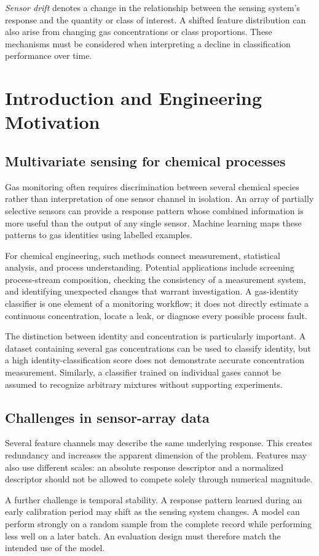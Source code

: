 \documentclass[11pt,a4paper]{article}
\newcommand{\sectionpage}[1]{\clearpage\section{#1}}
\begin{document}
\emph{Sensor drift} denotes a change in the relationship between the sensing system's response and the quantity or class of interest. A shifted feature distribution can also arise from changing gas concentrations or class proportions. These mechanisms must be considered when interpreting a decline in classification performance over time.

\sectionpage{Introduction and Engineering Motivation}
\subsection{Multivariate sensing for chemical processes}
Gas monitoring often requires discrimination between several chemical species rather than interpretation of one sensor channel in isolation. An array of partially selective sensors can provide a response pattern whose combined information is more useful than the output of any single sensor. Machine learning maps these patterns to gas identities using labelled examples.

For chemical engineering, such methods connect measurement, statistical analysis, and process understanding. Potential applications include screening process-stream composition, checking the consistency of a measurement system, and identifying unexpected changes that warrant investigation. A gas-identity classifier is one element of a monitoring workflow; it does not directly estimate a continuous concentration, locate a leak, or diagnose every possible process fault.

The distinction between identity and concentration is particularly important. A dataset containing several gas concentrations can be used to classify identity, but a high identity-classification score does not demonstrate accurate concentration measurement. Similarly, a classifier trained on individual gases cannot be assumed to recognize arbitrary mixtures without supporting experiments.

\subsection{Challenges in sensor-array data}
Several feature channels may describe the same underlying response. This creates redundancy and increases the apparent dimension of the problem. Features may also use different scales: an absolute response descriptor and a normalized descriptor should not be allowed to compete solely through numerical magnitude.

A further challenge is temporal stability. A response pattern learned during an early calibration period may shift as the sensing system changes. A model can perform strongly on a random sample from the complete record while performing less well on a later batch. An evaluation design must therefore match the intended use of the model.
\end{document}
